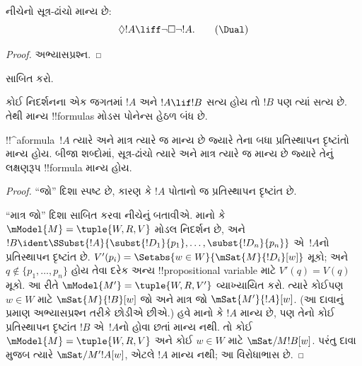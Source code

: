 \documentclass[../../../include/open-logic-section]{subfiles}
\begin{document}
\begin{prop}
  નીચેનો સૂત્ર-ઢાંચો \Dual{} માન્ય છે:
  \begin{equation*}
  \Diamond !A \liff \lnot\Box\lnot !A. \tag{\Dual}
  \end{equation*}
\end{prop}

\begin{proof}
  અભ્યાસપ્રશ્ન.
\end{proof}

\begin{prob}
   સાબિત કરો.
\end{prob}

\begin{prop}
  કોઈ નિદર્શનના એક જગતમાં $!A$ અને $!A \lif !B$
  સત્ય હોય તો $!B$ પણ ત્યાં સત્ય છે. તેથી માન્ય
  !!{formula}s મોડસ પોનેન્સ હેઠળ બંધ છે.
\end{prop}

\begin{prop}
  !!^a{formula}~$!A$ ત્યારે અને માત્ર ત્યારે જ માન્ય છે
  જ્યારે તેના બધા પ્રતિસ્થાપન દૃષ્ટાંતો માન્ય હોય.
  બીજા શબ્દોમાં, સૂત્ર-ઢાંચો ત્યારે અને માત્ર ત્યારે જ
  માન્ય છે જ્યારે તેનું લક્ષણરૂપ !!{formula} માન્ય હોય.
\end{prop}

\begin{proof}
  ``જો'' દિશા સ્પષ્ટ છે, કારણ કે $!A$ પોતાનો જ
  પ્રતિસ્થાપન દૃષ્ટાંત છે.

  ``માત્ર જો'' દિશા સાબિત કરવા નીચેનું બતાવીએ. માનો કે
  $\mModel{M} = \tuple{W, R, V}$ મોડલ નિદર્શન છે,
  અને $!B \ident
  \SSubst{!A}{\subst{!D_1}{p_1},\dots,\subst{!D_n}{p_n}}$
  એ~$!A$નો પ્રતિસ્થાપન દૃષ્ટાંત છે. $V'(p_i) =
  \Setabs{w \in W}{\mSat{M}{!D_i}[w]}$ મૂકો; અને
  $q \notin \{p_1,\dots,p_n\}$ હોય તેવા દરેક અન્ય
  !!{propositional variable} માટે $V'(q)=V(q)$ મૂકો.
  આ રીતે $\mModel{M'} = \tuple{W, R,V'}$ વ્યાખ્યાયિત કરો.
  ત્યારે કોઈપણ~$w \in W$ માટે
  $\mSat{M}{!B}[w]$ જો અને માત્ર જો $\mSat{M'}{!A}[w]$.
  (આ દાવાનું પ્રમાણ અભ્યાસપ્રશ્ન તરીકે છોડીએ છીએ.)
  હવે માનો કે $!A$ માન્ય છે, પણ તેનો કોઈ પ્રતિસ્થાપન
  દૃષ્ટાંત $!B$ એ~$!A$નો હોવા છતાં માન્ય નથી. તો કોઈ $\mModel{M} =
  \tuple{W, R, V}$ અને કોઈ $w \in W$ માટે
  $\mSat/{M}{!B}[w]$. પરંતુ દાવા મુજબ ત્યારે
  $\mSat/{M'}{!A}[w]$, એટલે $!A$ માન્ય નથી;
  આ વિરોધાભાસ છે.
\end{proof}
\end{document}

